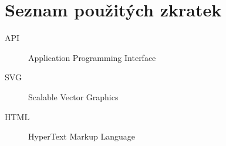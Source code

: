 \chapter*{Seznam použitých zkratek}
\begin{description}
    \item[API] Application Programming Interface
    \item[SVG] Scalable Vector Graphics
    \item[HTML] HyperText Markup Language
\end{description}
